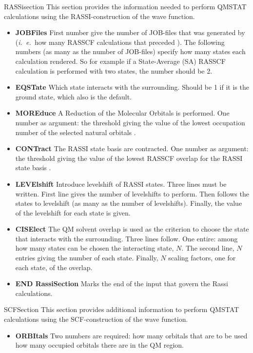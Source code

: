 \begin{keywordlist}
\item[RASSisection]
This section provides the information needed to perform QMSTAT calculations
using the RASSI-construction of the wave function.
\begin{itemize}
\item {\bf JOBFiles} First number give the number of JOB-files
that was generated by  ({\it i.~e.~}how many
RASSCF calculations that preceded ). The
following numbers (as many as the number of JOB-files) specify
how many states each calculation rendered. So for example if
a State-Average (SA) RASSCF calculation is performed with two
states, the number should be 2.
\item {\bf EQSTate} Which state interacts with the surrounding.
Should be 1 if it is the ground state, which also is the
default.
\item {\bf MOREduce} A Reduction of the Molecular Orbitals is performed.
One number as argument: the threshold giving the value of the lowest
occupation number of the selected natural orbitals \cite{Ohrn:07a}.
\item {\bf CONTract} The RASSI state basis are contracted.
One number as argument: the threshold giving the value of the lowest
RASSCF overlap for the RASSI state basis \cite{Ohrn:07a}.
\item {\bf LEVElshift} Introduce levelshift of RASSI states. Three lines must be written.
First line gives the number of levelshifts to perform. Then follows the states
to levelshift (as many as the number of levelshifts). Finally, the value of the
levelshift for each state is given.
\item {\bf CISElect} The QM solvent overlap is used as the criterion to choose
the state that interacts with the surrounding. Three lines follow. One entire:
among how many states can be chosen the interacting state, $N$. The
second line, $N$ entries giving the number of each state. Finally, $N$ scaling
factors, one for each state, of the overlap.
\item {\bf END RassiSection}
Marks the end of the input that govern the Rassi calculations.
\end{itemize}
\item[SCFSection]
This section provides additional information to perform QMSTAT calculations
using the SCF-construction of the wave function.
\begin{itemize}
\item {\bf ORBItals}
Two numbers are required: how many orbitals that are to be used
how many occupied orbitals there are in the QM region.

\end{itemize}
\end{keywordlist}
